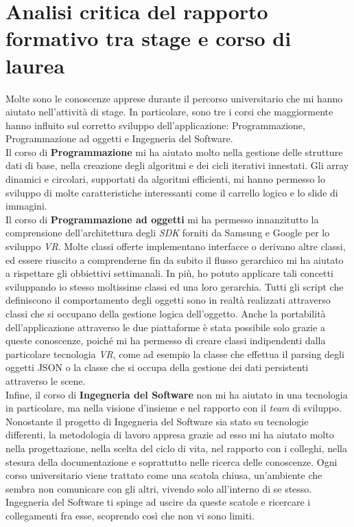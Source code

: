 \section{Analisi critica del rapporto formativo tra stage e corso di laurea}

Molte sono le conoscenze apprese durante il percorso universitario che mi hanno aiutato nell'attività di stage. In particolare, sono tre i corsi che maggiormente hanno influito sul corretto sviluppo dell'applicazione: Programmazione, Programmazione ad oggetti e Ingegneria del Software. \\
Il corso di \textbf{Programmazione} mi ha aiutato molto nella gestione delle strutture dati di base, nella creazione degli algoritmi e dei cicli iterativi innestati. Gli array dinamici e circolari, supportati da algoritmi efficienti, mi hanno permesso lo sviluppo di molte caratteristiche interessanti come il carrello logico e lo slide di immagini. \\
Il corso di \textbf{Programmazione ad oggetti} mi ha permesso innanzitutto la comprensione dell'architettura degli \textit{SDK} forniti da Samsung e Google per lo sviluppo \textit{VR}. Molte classi offerte implementano interfacce o derivano altre classi, ed essere riuscito a comprenderne fin da subito il flusso gerarchico mi ha aiutato a rispettare gli obbiettivi settimanali. In più, ho potuto applicare tali concetti sviluppando io stesso moltissime classi ed una loro gerarchia. Tutti gli script che definiscono il comportamento degli oggetti sono in realtà realizzati attraverso classi che si occupano della gestione logica dell'oggetto. Anche la portabilità dell'applicazione attraverso le due piattaforme è stata possibile solo grazie a queste conoscenze, poiché mi ha permesso di creare classi indipendenti dalla particolare tecnologia \textit{VR}, come ad esempio la classe che effettua il parsing degli oggetti JSON o la classe che si occupa della gestione dei dati persistenti attraverso le scene. \\
Infine, il corso di \textbf{Ingegneria del Software} non mi ha aiutato in una tecnologia in particolare, ma nella visione d'insieme e nel rapporto con il \textit{team} di sviluppo. Nonostante il progetto di Ingegneria del Software sia stato su tecnologie differenti, la metodologia di lavoro appresa grazie ad esso mi ha aiutato molto nella progettazione, nella scelta del ciclo di vita, nel rapporto con i colleghi, nella stesura della documentazione e soprattutto nelle ricerca delle conoscenze. Ogni corso universitario viene trattato come una scatola chiusa, un'ambiente che sembra non comunicare con gli altri, vivendo solo all'interno di se stesso. Ingegneria del Software ti spinge ad uscire da queste scatole e ricercare i collegamenti fra esse, scoprendo così che non vi sono limiti. \\
